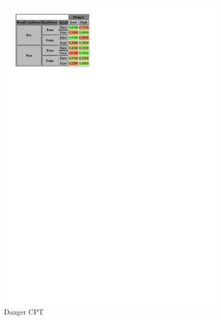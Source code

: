 \documentclass[a4paper,12pt]{article} %
\begin{document}
\begin{figure}[H]
\begin{minipage}[c]{.45\textwidth}
	\includegraphics[width=.9\linewidth]{../code/danger.pdf}	
	\caption*{Danger CPT}
	\label{fig:danger}
	\end{minipage}
\end{figure}
\end{document}
